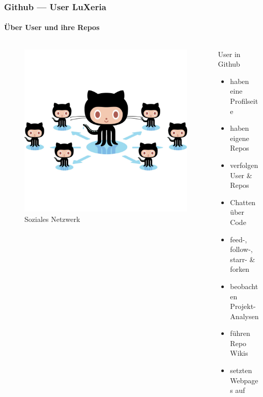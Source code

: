 \begin{frame}
    \frametitle{Github --- User \hfill{} LuXeria}
    \framesubtitle{Über User und ihre Repos}
    \begin{columns}
        \begin{column}{5cm}
            \begin{figure}
            \includegraphics[scale=0.15]{github_social.jpg}
            \caption{Soziales Netzwerk}
            \end{figure}
        \end{column}
        \begin{column}{5cm}
            \begin{block}{User in Github}
                \begin{itemize}
                    \item haben eine Profilseite
                    \item haben eigene Repos
                    \item verfolgen User \& Repos
                    \item Chatten über Code
                    \item feed-, follow-,  starr- \& forken
                    \item beobachten Projekt-Analysen
                    \item führen Repo Wikis
                    \item setzten Webpages auf
                \end{itemize}
            \end{block}
        \end{column}
    \end{columns}
\end{frame}

